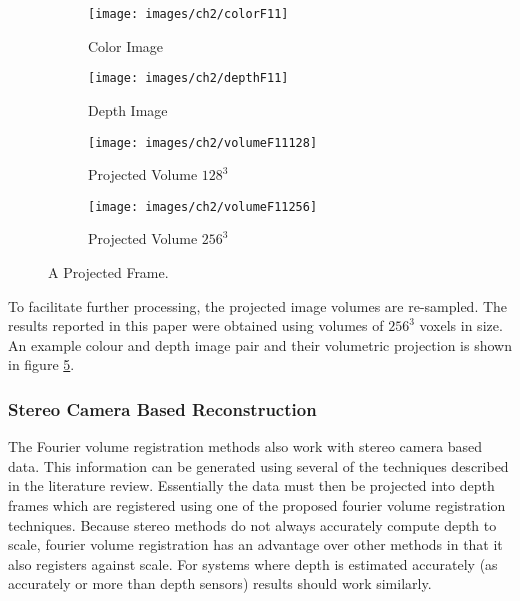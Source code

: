 \begin{figure}[t!] 
        \centering
        \begin{subfigure}[b]{1.8in}
                \texttt{[image: images/ch2/colorF11]}
                \caption{Color Image}
                \label{fig:COLEXAMPLE}
        \end{subfigure}%
        \begin{subfigure}[b]{1.8in}
                \texttt{[image: images/ch2/depthF11]}
                \caption{Depth Image}
                \label{fig:DEPTHEXAMPLE}
        \end{subfigure}
        
         \begin{subfigure}[b]{1.8in}
                \texttt{[image: images/ch2/volumeF11128]}
                \caption{Projected Volume $128^3$}
                \label{fig:VOLUMEEXAMPLE128}
        \end{subfigure}%
         \begin{subfigure}[b]{1.8in}
                \texttt{[image: images/ch2/volumeF11256]}
                \caption{Projected Volume $256^3$}
                \label{fig:VOLUMEEXAMPLE384}
        \end{subfigure}%
       \caption{A Projected Frame.}
       \label{fig:PROJECTED_FRAME}
\end{figure}


To facilitate further processing, the projected image volumes are re-sampled. The results reported in this paper were obtained using volumes of $256^3$ voxels in size. An example colour and depth image pair and their volumetric projection is shown in figure \ref{fig:PROJECTED_FRAME}.  \\


\subsubsection{Stereo Camera Based Reconstruction}

The Fourier volume registration methods also work with stereo camera based data. This information can be generated using several of the techniques described in the literature review. Essentially the data must then be projected into depth frames which are registered using one of the proposed fourier volume registration techniques. Because stereo methods do not always accurately compute depth to scale, fourier volume registration has an advantage over other methods in that it also registers against scale. For systems where depth is estimated accurately (as accurately or more than depth sensors) results should work similarly.

